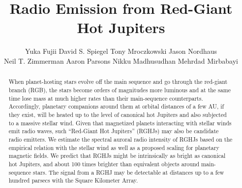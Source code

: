 \documentclass[iop,numberedappendix,apj]{emulateapj}
\begin{document}

\title{Radio Emission from Red-Giant Hot Jupiters}

\author{
%
Yuka Fujii 
%
David S. Spiegel
%
Tony Mroczkowski
%
Jason Nordhaus\\
%
Neil T. Zimmerman
%
Aaron Parsons
%
Nikku Madhusudhan
%
Mehrdad Mirbabayi
}

  









\vspace{0.5\baselineskip}



\begin{abstract}
When planet-hosting stars evolve off the main sequence and go through the red-giant branch (RGB), the stars become orders of magnitudes more luminous and at the same time lose mass at much higher rates than their main-sequence counterparts.
Accordingly, planetary companions around them at orbital distances of a few AU, if they exist, will be heated up to the level of canonical hot Jupiters and also subjected to a massive stellar wind.
Given that magnetized planets interacting with stellar winds emit radio waves, such ``Red-Giant Hot Jupiters'' (RGHJs) may also be candidate radio emitters.
We estimate the spectral auroral radio intensity of RGHJs based on the empirical relation with the stellar wind as well as a proposed scaling for planetary magnetic fields. 
We predict that RGHJs might be intrinsically as bright as canonical hot Jupiters, and about 100 times brighter than equivalent objects around main-sequence stars.  
The signal from a RGHJ may be detectable at distances up to a few hundred parsecs with the Square Kilometer Array. 
\end{abstract}
\end{document}
